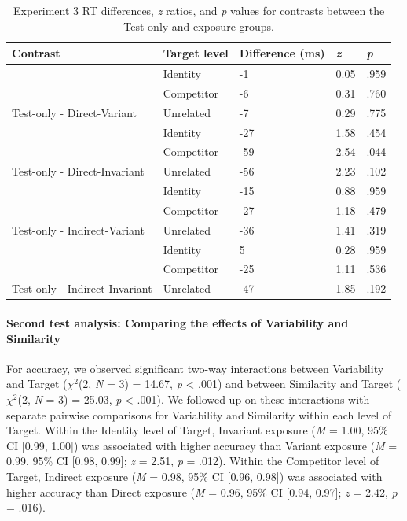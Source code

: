 \documentclass[
  12pt,
  twoside]{article}
\begin{document}
\begin{table}

\caption{\label{tab:exp3-test1-tab}Experiment 3 RT differences, \textit{z} ratios, and \textit{p} values for contrasts between the Test-only and exposure groups.}
\centering
\begin{tabular}[t]{l|l|l|l|l}
\hline
Contrast & Target level & Difference (ms) & \textit{z} & \textit{p}\\
\hline
 & Identity & -1 & 0.05 & .959\\
\cline{2-5}
 & Competitor & -6 & 0.31 & .760\\
\cline{2-5}
\multirow{-3}{*}{\raggedright\arraybackslash Test-only - Direct-Variant} & Unrelated & -7 & 0.29 & .775\\
\cline{1-5}
 & Identity & -27 & 1.58 & .454\\
\cline{2-5}
 & Competitor & -59 & 2.54 & .044\\
\cline{2-5}
\multirow{-3}{*}{\raggedright\arraybackslash Test-only - Direct-Invariant} & Unrelated & -56 & 2.23 & .102\\
\cline{1-5}
 & Identity & -15 & 0.88 & .959\\
\cline{2-5}
 & Competitor & -27 & 1.18 & .479\\
\cline{2-5}
\multirow{-3}{*}{\raggedright\arraybackslash Test-only - Indirect-Variant} & Unrelated & -36 & 1.41 & .319\\
\cline{1-5}
 & Identity & 5 & 0.28 & .959\\
\cline{2-5}
 & Competitor & -25 & 1.11 & .536\\
\cline{2-5}
\multirow{-3}{*}{\raggedright\arraybackslash Test-only - Indirect-Invariant} & Unrelated & -47 & 1.85 & .192\\
\hline
\end{tabular}
\end{table}

\hypertarget{second-test-analysis-comparing-the-effects-of-variability-and-similarity}{%
\paragraph{Second test analysis: Comparing the effects of Variability and Similarity}\label{second-test-analysis-comparing-the-effects-of-variability-and-similarity}}

For accuracy, we observed significant two-way interactions between Variability and Target (\(\chi^2\)(2, \emph{N} = 3) = 14.67, \emph{p} \textless{} .001) and between Similarity and Target (\(\chi^2\)(2, \emph{N} = 3) = 25.03, \emph{p} \textless{} .001).
We followed up on these interactions with separate pairwise comparisons for Variability and Similarity within each level of Target.
Within the Identity level of Target, Invariant exposure (\emph{M} = 1.00, 95\% CI {[}0.99, 1.00{]}) was associated with higher accuracy than Variant exposure (\emph{M} = 0.99, 95\% CI {[}0.98, 0.99{]}; \emph{z} = 2.51, \emph{p} = .012).
Within the Competitor level of Target, Indirect exposure (\emph{M} = 0.98, 95\% CI {[}0.96, 0.98{]}) was associated with higher accuracy than Direct exposure (\emph{M} = 0.96, 95\% CI {[}0.94, 0.97{]}; \emph{z} = 2.42, \emph{p} = .016).
\end{document}
